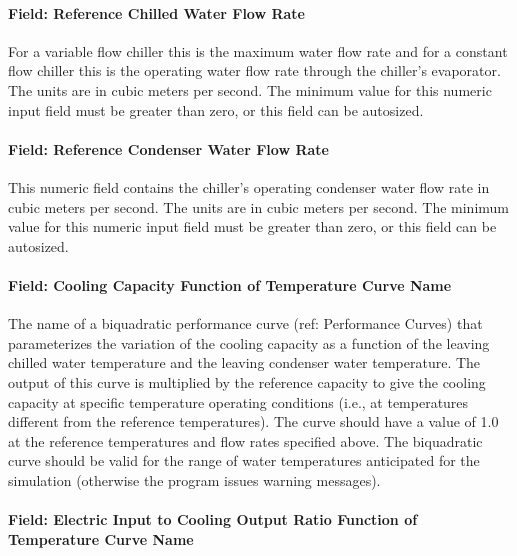 \paragraph{Field: Reference Chilled Water Flow Rate}\label{field-reference-chilled-water-flow-rate-1}

For a variable flow chiller this is the maximum water flow rate and for a constant flow chiller this is the operating water flow rate through the chiller's evaporator. The units are in cubic meters per second. The minimum value for this numeric input field must be greater than zero, or this field can be autosized.

\paragraph{Field: Reference Condenser Water Flow Rate}\label{field-reference-condenser-water-flow-rate}

This numeric field contains the chiller's operating condenser water flow rate in cubic meters per second. The units are in cubic meters per second. The minimum value for this numeric input field must be greater than zero, or this field can be autosized.

\paragraph{Field: Cooling Capacity Function of Temperature Curve Name}\label{field-cooling-capacity-function-of-temperature-curve-name-1}

The name of a biquadratic performance curve (ref: Performance Curves) that parameterizes the variation of the cooling capacity as a function of the leaving chilled water temperature and the leaving condenser water temperature. The output of this curve is multiplied by the reference capacity to give the cooling capacity at specific temperature operating conditions (i.e., at temperatures different from the reference temperatures). The curve should have a value of 1.0 at the reference temperatures and flow rates specified above. The biquadratic curve should be valid for the range of water temperatures anticipated for the simulation (otherwise the program issues warning messages).

\paragraph{Field: Electric Input to Cooling Output Ratio Function of Temperature Curve Name}\label{field-electric-input-to-cooling-output-ratio-function-of-temperature-curve-name-1}

